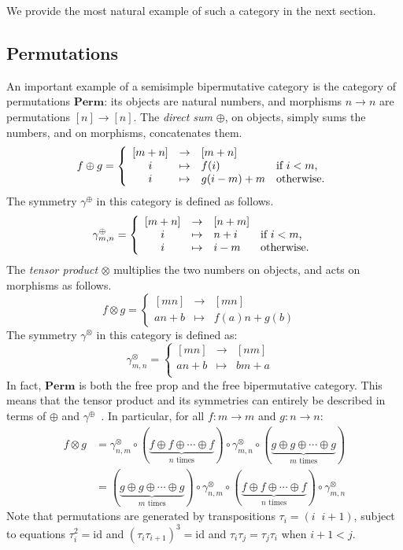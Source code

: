 \documentclass[a4paper]{article}
\theoremstyle{plain}
\theoremstyle{definition}
\newcommand{\cat}[1]{\mathbf{#1}}
\newcommand{\symtimes}{\gamma^\otimes}
\newcommand{\symplus}{\gamma^\oplus}
\newcommand{\iid}{\mathrm{id}}
\begin{document}
We provide the most natural example of such a category in the next section.

\subsection{Permutations}
An important example of a semisimple bipermutative category is the
category of permutations $\cat{Perm}$: its objects are natural
numbers, and morphisms $n \to n$ are permutations $[n] \to [n]$. The
\emph{direct sum} $\oplus$, on objects, simply sums the numbers, and
on morphisms, concatenates them.
\[
	f \oplus g =
	\left\{
		\begin{array}{ccll}
			[m+n] & \to & [m+n] & \\
			i & \mapsto & f(i) & \text{if } i<m\text, \\
			i & \mapsto & g(i-m)+m & \text{otherwise.}
		\end{array}
	\right.
\]
The symmetry $\symplus$ in this category is defined as follows.
\[
	\symplus_{m,n} =
	\left\{
		\begin{array}{ccll}
			[m+n] & \to & [n+m] & \\
			i & \mapsto & n+i & \text{if } i<m\text, \\
			i & \mapsto & i-m & \text{otherwise.}
		\end{array}
	\right.
\]
The \emph{tensor product} $\otimes$ multiplies the two numbers on objects, and acts on morphisms as follows.
\[
	f \otimes g =
	\left\{
		\begin{array}{ccll}
			[mn] & \to & [mn] & \\
			an+b & \mapsto & f(a)n + g(b) &
		\end{array}
	\right.
\]
The symmetry $\symtimes$ in this category is defined as:
\[
	\symtimes_{m,n} =
	\left\{
		\begin{array}{ccll}
			[mn] & \to & [nm] & \\
			an+b & \mapsto & bm+a & \\
		\end{array}
	\right.
\]
In fact, $\cat{Perm}$ is both the free prop and the free bipermutative
category. This means that the tensor product and its symmetries can entirely be
described in terms of $\oplus$ and $\symplus$~\cite[Lemma
S3]{caretteetal:free}. In particular, for all $f \colon m \to m$ and $g \colon
n \to n$:
\begin{align}
	\label{eq:kron}
	f \otimes g &=
	\symtimes_{n, m} \circ (\underbrace{ f \oplus
	 f \oplus \cdots \oplus f}_{n\text{ times}}) \circ
	\symtimes_{m,n} \circ
	(\underbrace{ g \oplus g \oplus
	\cdots \oplus g}_{m\text{ times}}) \\[1.5ex]
	&=
	(\underbrace{ g \oplus g \oplus
	\cdots \oplus g}_{m\text{ times}})
	\circ
	\symtimes_{n, m} \circ (\underbrace{ f \oplus
	 f \oplus \cdots \oplus f}_{n\text{ times}}) \circ
	\symtimes_{m,n}
\end{align}
Note that permutations are generated by transpositions
$\tau_i = (i \;\; i+1)$, subject to equations $\tau_i^2 = \iid$ and $(\tau_i \tau_{i+1})^3 = \iid$ and $\tau_i \tau_j = \tau_j \tau_i$ when $i+1<j$.
\end{document}
